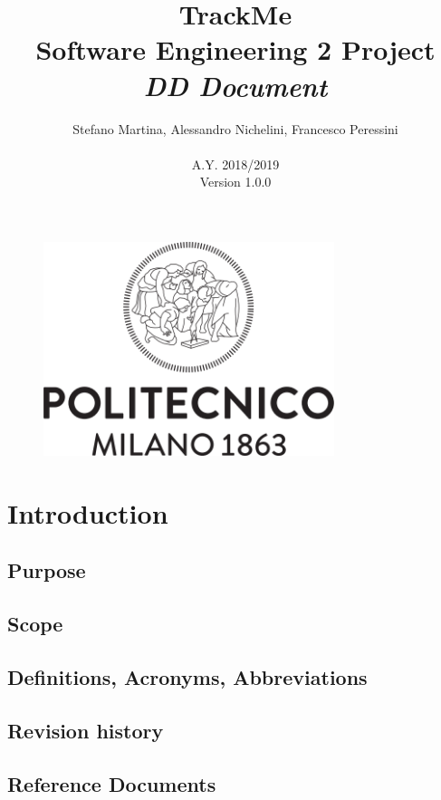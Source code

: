 \documentclass{article}
\begin{document}
	\begin{figure}[t]
	\centering
	\includegraphics[height=6.25cm,keepaspectratio]{Figures/logo}
	\end{figure}
	
	\title{TrackMe \\ Software Engineering 2 Project \\ 
			\textit{DD Document} }
	\author{Stefano Martina, Alessandro Nichelini, Francesco Peressini
		\\ \\ A.Y. 2018/2019 \\ Version 1.0.0}
		
\maketitle
\newpage

\tableofcontents

\newpage
\section{Introduction}

\subsection{Purpose}
\subsection{Scope}
\subsection{Definitions, Acronyms, Abbreviations}
\subsection{Revision history}
\subsection{Reference Documents}
\end{document}
